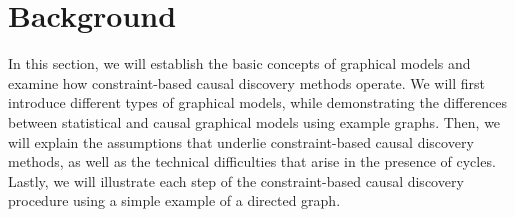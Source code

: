 \documentclass[twoside, 11pt]{article}
\begin{document}





\section{Background}
In this section, we will establish the basic concepts of graphical models and examine how constraint-based causal discovery methods operate. We will first introduce different types of graphical models, while demonstrating the differences between statistical and causal graphical models using example graphs. Then, we will explain the assumptions that underlie constraint-based causal discovery methods, as well as the technical difficulties that arise in the presence of cycles. Lastly, we will illustrate each step of the constraint-based causal discovery procedure using a simple example of a directed graph.
\end{document}
